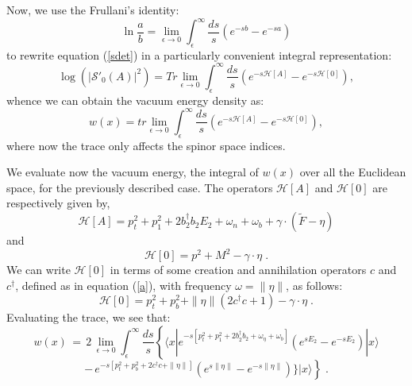 \documentclass[a4paper,12pt]{article}
\newcommand{\Fd}{\widetilde{F}}
\newcommand{\n}{\eta}
\newcommand{\w}{\omega}
\begin{document}
Now,  we use the Frullani's identity:
\begin{equation}
\ln \frac{a}{b}=\lim_{\epsilon \to 0} \int_\epsilon^\infty \frac{ds}{s}(e^{-sb}-e^{-sa})
\end{equation}
to rewrite equation (\ref{sdet}) in a particularly convenient integral
representation:
\begin{equation}\label{str}
\log(|{\mathcal S}'_0(A)|^2)= Tr \lim_{\epsilon \to 0} \int_\epsilon ^\infty \frac{ds}{s} (e^{-s{\mathcal H}[A]}-e^{-s{\mathcal H}[0]}),
\end{equation}
whence we can obtain the vacuum energy density as: 
\begin{equation}\label{wtr}
w(x) = tr \lim_{\epsilon \to 0} \int_\epsilon ^\infty \frac{ds}{s} (e^{-s{\mathcal H}[A]}-e^{-s{\mathcal H}[0]}),
\end{equation}
where now the trace only affects the spinor space indices.

We evaluate now the vacuum energy, the integral of $w(x)$ over all the
Euclidean space, for the previously described case. The operators
${\mathcal H}[A]$ and ${\mathcal H}[0]$ are respectively given by,
\begin{equation}\label{HA}
{\mathcal H}[A]=p_t^2 + p_1^2 + 2b_2^\dagger b_2 E_2 + \w_n + \w_b +\gamma \cdot (\Fd-\n)
\end{equation}
and
\begin{equation}\label{H0}
{\mathcal H}[0]= p^2 + M^2 - \gamma \cdot \n \;.
\end{equation}
We can write ${\mathcal H}[0]$ in terms of some creation and
annihilation operators $c$ and $c^\dagger$, defined as in equation
(\ref{a}), with frequency $\w=\|\n\|$, as follows:
\begin{equation}\label{H0c}
{\mathcal H}[0]= p_t^2 + p_b^2 + \|\n\|(2c^\dagger c+1) - \gamma \cdot\n \;.
\end{equation}
Evaluating the trace, we see that:
$$ w(x)\,=\, 2 \,\lim_{\epsilon \to 0} \int_\epsilon ^\infty\frac{ds}{s} \left\{ \langle x|e^{-s[p_t^2+p_1^2+2b_2^\dagger
b_2+\w_\n+\w_b]}(e^{sE_2}-e^{-sE_2}) |x\rangle \right.$$ 
\begin{equation}\label{wtr1}
\left. -\, e^{-s[p_t^2+p_b^2+2c^\dagger c+\|\n\|]}(e^{s\|\n\|}-e^{-s\|\n\|})\}|x\rangle\right\} \;.
\end{equation}
\end{document}
